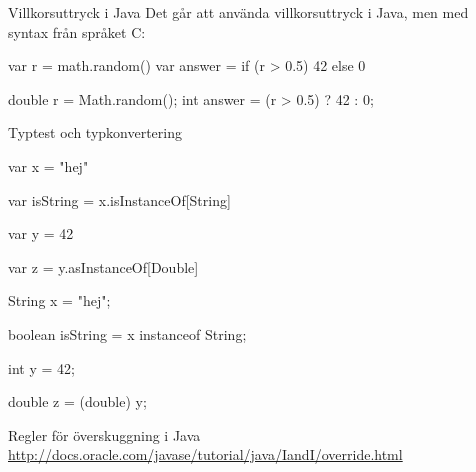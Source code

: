 \begin{Slide}{Villkorsuttryck i Java}\SlideFontSmall
Det går att använda villkorsuttryck i Java, men med syntax från språket C:
\begin{multicols}{2}
  \noindent{}
\begin{CodeSmall}[basicstyle=\ttfamily\SlideFontSize{6}{8},backgroundcolor=\color{white},
  frame=none]
var r = math.random()
var answer = if (r > 0.5) 42 else 0
\end{CodeSmall}

\columnbreak

\noindent{}
\begin{CodeSmall}[language=Java,basicstyle=\ttfamily\SlideFontSize{6}{8},backgroundcolor=\color{white},
  frame=none]
double r = Math.random();
int answer = (r > 0.5) ? 42 : 0;
\end{CodeSmall}
\end{multicols}

\end{Slide}




\begin{Slide}{Typtest och typkonvertering}

\begin{multicols}{2}
  \noindent{}
\begin{CodeSmall}[basicstyle=\small\ttfamily\SlideFontSize{6}{8},backgroundcolor=\color{white},
  frame=none]
var x = "hej"

var isString = x.isInstanceOf[String]

var y = 42

var z = y.asInstanceOf[Double]

\end{CodeSmall}

\columnbreak

\noindent{}
\begin{CodeSmall}[language=Java,basicstyle=\small\ttfamily\SlideFontSize{6}{8},backgroundcolor=\color{white},
  frame=none]
String x = "hej";

boolean isString = x instanceof String;

int y = 42;

double z = (double) y;
\end{CodeSmall}
\end{multicols}


\end{Slide}

\begin{Slide}{Regler för överskuggning i Java}
\url{http://docs.oracle.com/javase/tutorial/java/IandI/override.html}
\end{Slide}
  


